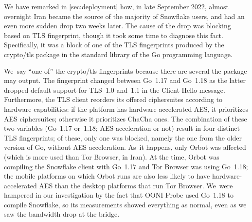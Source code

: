 \documentclass[letterpaper,twocolumn]{article}
\begin{document}
We have remarked in \autoref{sec:deployment} how,
in late September 2022,
almost overnight Iran became the source of the majority of Snowflake users,
and had an even more sudden drop two weeks later.
The cause of the drop was blocking based on TLS fingerprint,
though it took some time to diagnose this fact.
Specifically, it was a block of one of the TLS fingerprints
produced by the crypto/tls package in the standard library of
the Go programming language.

We~say ``one of'' the crypto/tls fingerprints
because there are several the package may output.
The fingerprint changed between Go~1.17 and Go~1.18
as the latter dropped default support for TLS~1.0 and~1.1
in the Client Hello message.
Furthermore, the TLS client reorders its offered ciphersuites
according to hardware capabilities:
if the platform has hardware-accelerated AES,
it prioritizes AES ciphersuites;
otherwise it prioritizes ChaCha ones.
The combination of these two variables
(Go~1.17 or~1.18; AES acceleration or not)
result in four distinct TLS fingerprints;
of these, only one was blocked, namely the one from
the older version of Go, without AES acceleration.
As~it happens, only Orbot was affected
(which is more used than Tor Browser, in Iran).
At the time, Orbot was compiling the Snowflake client with Go~1.17
and Tor Browser was using Go~1.18;
the mobile platforms on which Orbot runs are also less likely to
have hardware-accelerated AES
than the desktop platforms that run Tor Browser.
We~were hampered in our investigation by the fact that
OONI Probe used Go~1.18 to compile Snowflake,
so its measurements showed everything as normal,
even as we saw the bandwidth drop at the bridge.
\end{document}
